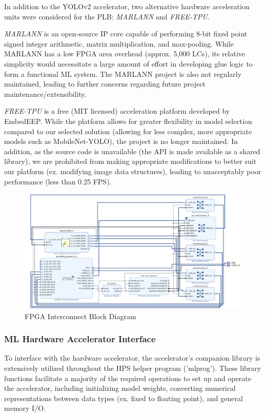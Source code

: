 In addition to the YOLOv2 accelerator, two alternative hardware acceleration units were considered for the PLB: \textit{MARLANN}\cite{marlann} and \textit{FREE-TPU}\cite{freetpu}. 

\textit{MARLANN} is an open-source IP core capable of performing 8-bit fixed point signed integer arithmetic, matrix multiplication, and max-pooling. While MARLANN has a low FPGA area overhead (approx. 5,000 LCs), its relative simplicity would necessitate a large amount of effort in developing glue logic to form a functional ML system. The MARLANN project is also not regularly maintained, leading to further concerns regarding future project maintenance/extensibility.

\textit{FREE-TPU} is a free (MIT licensed) acceleration platform developed by EmbedEEP. While the platform allows for greater flexibility in model selection compared to our selected solution (allowing for less complex, more appropriate models such as MobileNet-YOLO), the project is no longer maintained. In addition, as the source code is unavailable (the API is made available as a shared library), we are prohibited from making appropriate modifications to better suit our platform (ex. modifying image data structures), leading to unacceptably poor performance (less than 0.25 FPS).

\begin{figure}[H]
\centering
\includegraphics[width=14cm]{img/fpga_interconnect.pdf}
\caption{FPGA Interconnect Block Diagram}
\label{interconnect}
\end{figure}

\subsubsection{ML Hardware Accelerator Interface}
To interface with the hardware accelerator, the accelerator's companion library\cite{yolov2accel} is extensively utilized throughout the HPS helper program ('mlprog'). These library functions facilitate a majority of the required operations to set up and operate the accelerator, including initializing model weights, converting numerical representations between data types (ex. fixed to floating point), and general memory I/O. 

